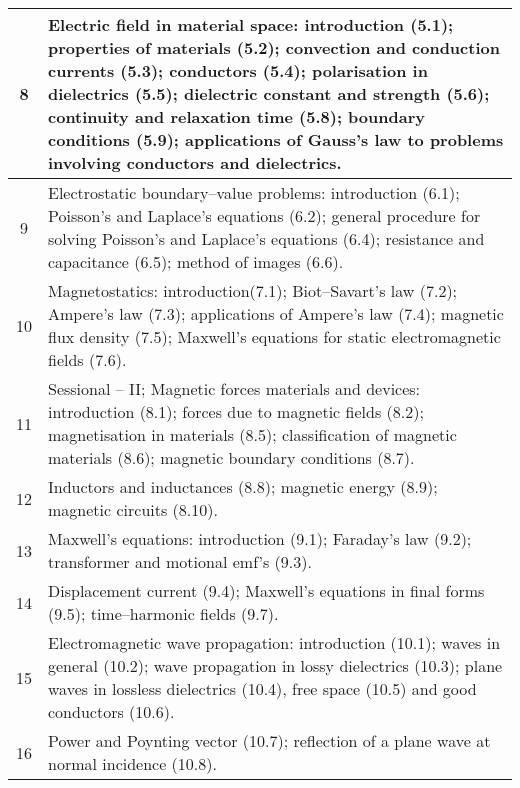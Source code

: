 \documentclass[12pt,a4paper]{article}
\begin{document}
\begin{center}
\begin{longtable}{|c|p{13cm}|}
		\hline
		8 \rule{0pt}{2.6ex} & Electric field in material space: introduction (5.1); properties of materials (5.2); convection and conduction currents (5.3); conductors (5.4); polarisation in dielectrics (5.5); dielectric constant and strength (5.6); continuity and relaxation time (5.8); boundary conditions (5.9); applications of Gauss's law to problems involving conductors and dielectrics.\\
		\hline
		9 \rule{0pt}{2.6ex} & Electrostatic boundary--value problems: introduction (6.1); Poisson's and Laplace's equations (6.2); general procedure for solving Poisson's and Laplace's equations (6.4); resistance and capacitance (6.5); method of images (6.6).\\
		\hline
		10 \rule{0pt}{2.6ex} & Magnetostatics: introduction(7.1); Biot--Savart's law (7.2); Ampere's law (7.3); applications of Ampere's law (7.4); magnetic flux density (7.5); Maxwell's equations for static electromagnetic fields (7.6).\\
		\hline
		11 \rule{0pt}{2.6ex} & Sessional -- II; Magnetic forces materials and devices: introduction (8.1); forces due to magnetic fields (8.2); magnetisation in materials (8.5); classification of magnetic materials (8.6); magnetic boundary conditions (8.7).\\
		\hline
		12 \rule{0pt}{2.6ex} & Inductors and inductances (8.8); magnetic energy (8.9); magnetic circuits (8.10).\\
		\hline
		13 \rule{0pt}{2.6ex} & Maxwell's equations: introduction (9.1); Faraday's law (9.2); transformer and motional emf's (9.3).\\
		\hline
		14 \rule{0pt}{2.6ex} & Displacement current (9.4); Maxwell's equations in final forms (9.5); time--harmonic fields (9.7).\\
		\hline
		15 \rule{0pt}{2.6ex} & Electromagnetic wave propagation: introduction (10.1); waves in general (10.2); wave propagation in lossy dielectrics (10.3); plane waves in lossless dielectrics (10.4), free space (10.5) and good conductors (10.6).\\
		\hline
		16 \rule{0pt}{2.6ex} & Power and Poynting vector (10.7); reflection of a plane wave at normal incidence (10.8).\\
	\hline \hline
	\end{longtable}
\end{center}
\end{document}
